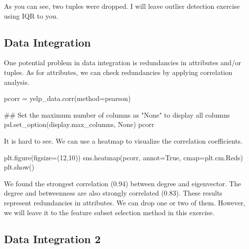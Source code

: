 \documentclass[
  letterpaper,
]{scrbook}
\newenvironment{Shaded}{\begin{snugshade}}{\end{snugshade}}
\newcommand{\CommentTok}[1]{\textcolor[rgb]{0.37,0.37,0.37}{#1}}
\newcommand{\DecValTok}[1]{\textcolor[rgb]{0.68,0.00,0.00}{#1}}
\newcommand{\NormalTok}[1]{\textcolor[rgb]{0.00,0.23,0.31}{#1}}
\newcommand{\OperatorTok}[1]{\textcolor[rgb]{0.37,0.37,0.37}{#1}}
\newcommand{\StringTok}[1]{\textcolor[rgb]{0.13,0.47,0.30}{#1}}
\newcommand{\VariableTok}[1]{\textcolor[rgb]{0.07,0.07,0.07}{#1}}
\begin{document}
As you can see, two tuples were dropped. I will leave outlier detection
exercise using IQR to you.

\subsection*{Data Integration}\label{data-integration}

One potential problem in data integration is redundancies in attributes
and/or tuples. As for attributes, we can check redundancies by applying
correlation analysis.

\begin{Shaded}
\begin{Highlighting}[]
\NormalTok{pcorr }\OperatorTok{=}\NormalTok{ yelp\_data.corr(method}\OperatorTok{=}\StringTok{\textquotesingle{}pearson\textquotesingle{}}\NormalTok{)}

\CommentTok{\#\# Set the maximum number of columns as "None" to display all columns}
\NormalTok{pd.set\_option(}\StringTok{\textquotesingle{}display.max\_columns\textquotesingle{}}\NormalTok{, }\VariableTok{None}\NormalTok{)}
\NormalTok{pcorr}
\end{Highlighting}
\end{Shaded}

It is hard to see. We can use a heatmap to visualize the correlation
coefficients.

\begin{Shaded}
\begin{Highlighting}[]
\NormalTok{plt.figure(figsize}\OperatorTok{=}\NormalTok{(}\DecValTok{12}\NormalTok{,}\DecValTok{10}\NormalTok{))}
\NormalTok{sns.heatmap(pcorr, annot}\OperatorTok{=}\VariableTok{True}\NormalTok{, cmap}\OperatorTok{=}\NormalTok{plt.cm.Reds)}
\NormalTok{plt.show()}
\end{Highlighting}
\end{Shaded}

We found the strongest correlation (0.94) between degree and
eigenvector. The degree and betweenness are also strongly correlated
(0.83). These results represent redundancies in attributes. We can drop
one or two of them. However, we will leave it to the feature subset
selection method in this exercise.

\subsection*{Data Integration 2}\label{data-integration-2}
\end{document}
